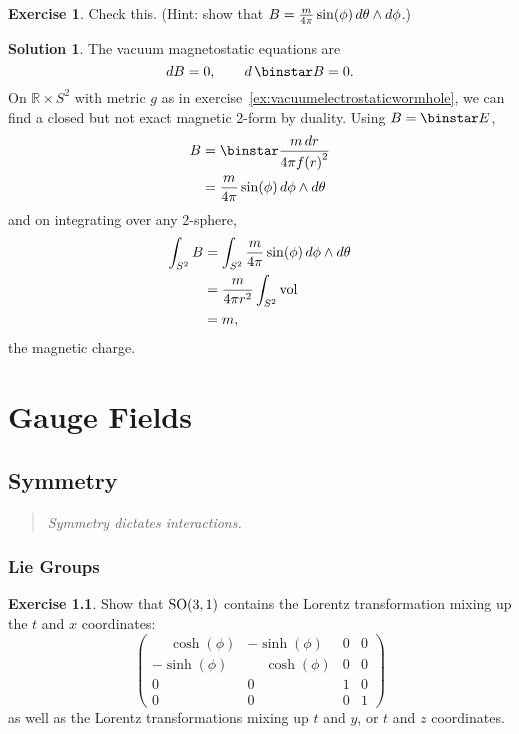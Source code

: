 \documentclass[11pt, a4paper]{report}
\theoremstyle{definition}
\newtheorem{exercise}{Exercise}[part]
\newtheorem{solution}{Solution}[part]
\newenvironment{ex}{\begin{exercise}}{\end{exercise}\pagebreak[1]}
\newenvironment{sol}{\begin{solution}}{\end{solution}\pagebreak[3]}
\newenvironment{epigraph}
    {\begin{quote}\small\itshape} %
    {\end{quote}\ignorespacesafterend\vspace{\parskip}}
\newcommand*{\SO}{\ensuremath\text{SO}}
\newcommand*{\op}[1]{\ensuremath\mathop{}\mathopen{}#1}
\renewcommand*{\d}{\op{d}}
\renewcommand*{\star}{\op{\binstar}\mathord{}}
\begin{document}
\begin{ex}

Check this. (Hint: show that $B = \frac{m}{4 \pi} \sin(\phi) \d \theta \wedge d\phi$.)

\end{ex}

\begin{sol}

The vacuum magnetostatic equations are
\[
    dB = 0, \qquad
    d \star B = 0.
\]
On $\mathbb{R} \times S^2$ with metric $g$ as in exercise~\ref{ex:vacuumelectrostaticwormhole}, we can find a closed but not exact magnetic 2-form by duality. Using $B = \star E$,
\begin{align*}
    B &= \star \frac{m \d r}{4 \pi {f(r)}^2} \\
      &= \frac{m}{4 \pi} \sin(\phi) \d \phi \wedge d\theta
\end{align*}
and on integrating over any 2-sphere,
\begin{align*}
    \int_{S^2} B &= \int_{S^2} \frac{m}{4 \pi} \sin(\phi) \d \phi \wedge d\theta \\
        &= \frac{m}{4 \pi r^2} \int_{S^2} \text{vol} \\
        &= m,
\end{align*}
the magnetic charge.

\end{sol}

\part{Gauge Fields}

\chapter{Symmetry}

\begin{epigraph}
    Symmetry dictates interactions.
\end{epigraph}

\section{Lie Groups}\label{sec:liegroups}

\begin{ex}

Show that $\SO(3, 1)$ contains the Lorentz transformation mixing up the $t$ and $x$ coordinates:
\[
    \begin{pmatrix}
        \phantom{-}\cosh(\phi) & -\sinh(\phi)           & 0 & 0 \\
        -\sinh(\phi)           & \phantom{-}\cosh(\phi) & 0 & 0 \\
        0                      & 0                      & 1 & 0 \\
        0                      & 0                      & 0 & 1
    \end{pmatrix}
\]
as well as the Lorentz transformations mixing up $t$ and $y$, or $t$ and $z$ coordinates.

\end{ex}
\end{document}
